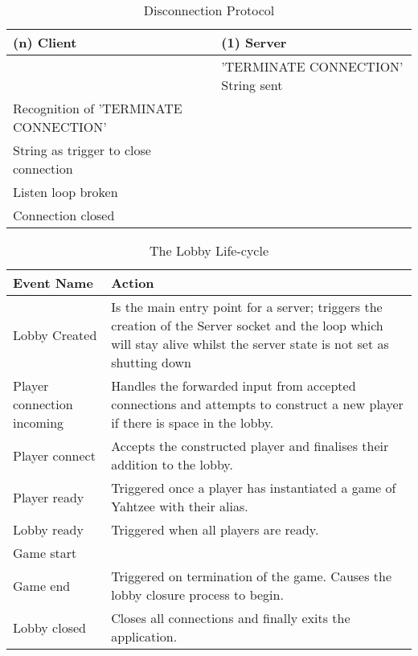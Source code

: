 \begin{table}[H]
	\centering
	\begin{tabular}{ | l | l | }
				\hline
				(n) Client & (1) Server  \\
				\hline
				\hline
				&  'TERMINATE CONNECTION' String sent \\
				\hline
				Recognition of 'TERMINATE CONNECTION' & \\ 
				String as trigger to close connection & \\
				\hline 
				Listen loop broken & \\
				\hline
				Connection closed & \\
				\hline
	\end{tabular}
	\caption{Disconnection Protocol}
	\label{tab:disconnectionProtocol}
\end{table}

\begin{table}[H]
	\centering
	\begin{tabular}{ | l | p{10cm} | }
		\hline
		Event Name & Action  \\
		\hline
		\hline
		Lobby Created & Is the main entry point for a server; triggers the creation of the Server socket and the loop which will stay alive whilst the server state is not set as shutting down \\
		\hline
		Player connection incoming & Handles the forwarded input from accepted connections and attempts to construct a new player if there is space in the lobby. \\
		\hline
		Player connect & Accepts the constructed player and finalises their addition to the lobby. \\
		\hline
		Player ready & Triggered once a player has instantiated a game of Yahtzee with their alias. \\
		\hline
		Lobby ready & Triggered when all players are ready. \\ 
		\hline
		Game start  & \\
		\hline
		Game end  & Triggered on termination of the game. Causes the lobby closure process to begin. \\
		\hline
		Lobby closed & Closes all connections and finally exits the application. \\
		\hline
	\end{tabular}
	\caption{The Lobby Life-cycle}
	\label{tab:lobbyLifecycle}
\end{table}

